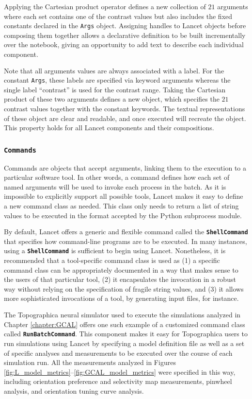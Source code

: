 \documentclass[phd,ianc,twoside]{infthesis}
\newcommand{\tbf}[1]{\texttt{\textbf{#1}}}
\begin{document}
Applying the Cartesian product operator defines a new collection of $21$
arguments where each set contains one of the contrast values but also
includes the fixed constants declared in the {\tt Args}
object. Assigning handles to Lancet objects before composing them
together allows a declarative definition to be built incrementally over
the notebook, giving an opportunity to add text to describe each
individual component.

Note that all arguments values are always associated with a label. For
the constant {\tt Args}, these labels are specified via keyword
arguments whereas the single label ``contrast'' is used for the contrast
range. Taking the Cartesian product of these two arguments defines a new
object, which specifies the $21$ contrast values together with the
constant keywords. The textual representations of these object are clear
and readable, and once executed will recreate the object. This property
holds for all Lancet components and their compositions.


\subsubsection*{\tbf{Commands}}

Commands are objects that accept arguments, linking them to the
execution to a particular software tool. In other words, a command
defines how each set of named arguments will be used to invoke each
process in the batch. As it is impossible to explicitly support all
possible tools, Lancet makes it easy to define a new command class as
needed. This class only needs to return a list of string values to be
executed in the format accepted by the Python subprocess module.

By default, Lancet offers a generic and flexible command called the
\tbf{ShellCommand} that specifies how command-line programs are to be
executed. In many instances, using a \tbf{ShellCommand} is sufficient to
begin using Lancet. Nonetheless, it is recommended that a tool-specific
command class is used as (1) a specific command class can be
appropriately documented in a way that makes sense to the users of that
particular tool, (2) it encapsulates the invocation in a robust way
without relying on the specification of fragile string values, and (3) it
allows more sophisticated invocations of a tool, by generating input
files, for instance.

The Topographica neural simulator \citep{bednar_bmm08} used to execute
the simulations analyzed in Chapter \ref{chapter:GCAL} offers one such
example of a customized command class called \tbf{RunBatchCommand}. This
component makes it easy for Topographica users to run simulations using
Lancet by specifying a model definition file as well as a set of
specific analyses and measurements to be executed over the course of
each simulation run. All the measurements analyzed in Figures
\ref{fig:L_model_metrics}--\ref{fig:GCAL_model_metrics} were specified
in this way, including orientation preference and selectivity map
measurements, pinwheel analysis, and orientation tuning curve analysis.
\end{document}
